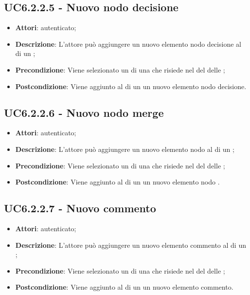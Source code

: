 \subsection{UC6.2.2.5 - Nuovo nodo decisione}
\label{ssec:UC6.2.2.5}
\begin{itemize}
\item \textbf{Attori}:  autenticato;
\item \textbf{Descrizione}: L'attore può aggiungere un nuovo elemento nodo decisione al  di un ;
\item \textbf{Precondizione}: Viene selezionato un  di una  che risiede nel  del  delle  ;
\item \textbf{Postcondizione}: Viene aggiunto al  di un  un nuovo elemento nodo decisione.
\end{itemize}
\subsection{UC6.2.2.6 - Nuovo nodo merge}
\label{ssec:UC6.2.2.6}
\begin{itemize}
\item \textbf{Attori}:  autenticato;
\item \textbf{Descrizione}: L'attore può aggiungere un nuovo elemento nodo  al  di un ;
\item \textbf{Precondizione}: Viene selezionato un  di una  che risiede nel  del  delle  ;
\item \textbf{Postcondizione}: Viene aggiunto al  di un  un nuovo elemento nodo .
\end{itemize}
\subsection{UC6.2.2.7 - Nuovo commento}
\label{ssec:UC6.2.2.7}
\begin{itemize}
\item \textbf{Attori}:  autenticato;
\item \textbf{Descrizione}: L'attore può aggiungere un nuovo elemento commento al  di un ;
\item \textbf{Precondizione}: Viene selezionato un  di una  che risiede nel  del  delle  ;
\item \textbf{Postcondizione}: Viene aggiunto al  di un  un nuovo elemento commento.
\end{itemize}
